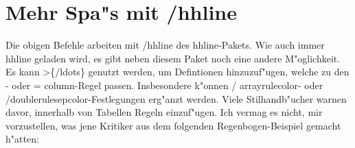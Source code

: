 \documentclass[ngerman]{article}
\begin{document}
{ \section{Mehr Spa"s mit \slash \textsf{hhline}}

Die obigen Befehle arbeiten mit \slash \textsf{hhline} des \textsf{hhline}-Pakets. Wie auch 
immer\\
\textsf{hhline} geladen wird, es gibt neben diesem Paket noch eine andere M"oglichkeit. Es 
kann >\{\slash \textsf{ldots}\} genutzt werden, um Defintionen hinzuzuf"ugen, welche zu den
- oder = \textsf{column}-Regel passen. Insbesondere k"onnen \slash
  \textsf{arrayrulecolor}- oder  \slash \textsf{doublerulesepcolor}-Festlegungen erg"anzt werden. 
Viele Stilhandb"ucher warnen davor, innerhalb von Tabellen Regeln
einzuf"ugen. Ich vermag es nicht, mir 
vorzustellen, was jene Kritiker aus dem folgenden Regenbogen-Beispiel gemacht h"atten:

}
\end{document}
